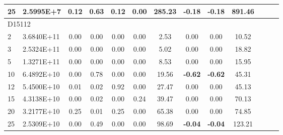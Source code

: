 {\begin{longtable}{@{}llccccccccccc@{}}
\multicolumn{1}{l|}{25} & \multicolumn{1}{l|}{2.5995E+7}  & \multicolumn{1}{c|}{0.12}    & \multicolumn{1}{c|}{0.63} & \multicolumn{1}{c|}{0.12}   & 0.00 & \multicolumn{1}{c|}{285.23}   & \textbf{-0.18}  & \textbf{-0.18}  & 891.46    \\ \hline
\multicolumn{10}{l}{D15112}                                                                                                                                                                                                               \\ \hline
\multicolumn{1}{l|}{2}  & \multicolumn{1}{l|}{3.6840E+11} & \multicolumn{1}{c|}{0.00}    & \multicolumn{1}{c|}{0.00} & \multicolumn{1}{c|}{0.00}   & 0.00 & \multicolumn{1}{c|}{2.53}     & 0.00            & 0.00            & 10.52     \\
\multicolumn{1}{l|}{3}  & \multicolumn{1}{l|}{2.5324E+11} & \multicolumn{1}{c|}{0.00}    & \multicolumn{1}{c|}{0.00} & \multicolumn{1}{c|}{0.00}   & 0.00 & \multicolumn{1}{c|}{5.02}     & 0.00            & 0.00            & 18.82     \\
\multicolumn{1}{l|}{5}  & \multicolumn{1}{l|}{1.3271E+11} & \multicolumn{1}{c|}{0.00}    & \multicolumn{1}{c|}{0.00} & \multicolumn{1}{c|}{0.00}   & 0.00 & \multicolumn{1}{c|}{8.53}     & 0.00            & 0.00            & 15.95     \\
\multicolumn{1}{l|}{10} & \multicolumn{1}{l|}{6.4892E+10} & \multicolumn{1}{c|}{0.00}    & \multicolumn{1}{c|}{0.78} & \multicolumn{1}{c|}{0.00}   & 0.00 & \multicolumn{1}{c|}{19.56}    & \textbf{-0.62}  & \textbf{-0.62}  & 45.31     \\
\multicolumn{1}{l|}{12} & \multicolumn{1}{l|}{5.4500E+10} & \multicolumn{1}{c|}{0.01}    & \multicolumn{1}{c|}{0.02} & \multicolumn{1}{c|}{0.92}   & 0.00 & \multicolumn{1}{c|}{27.47}    & 0.00            & 0.00            & 45.13     \\
\multicolumn{1}{l|}{15} & \multicolumn{1}{l|}{4.3138E+10} & \multicolumn{1}{c|}{0.00}    & \multicolumn{1}{c|}{0.02} & \multicolumn{1}{c|}{0.00}   & 0.24 & \multicolumn{1}{c|}{39.47}    & 0.00            & 0.00            & 70.13     \\
\multicolumn{1}{l|}{20} & \multicolumn{1}{l|}{3.2177E+10} & \multicolumn{1}{c|}{0.25}    & \multicolumn{1}{c|}{0.01} & \multicolumn{1}{c|}{0.25}   & 0.00 & \multicolumn{1}{c|}{65.38}    & 0.00            & 0.00            & 74.85     \\
\multicolumn{1}{l|}{25} & \multicolumn{1}{l|}{2.5309E+10} & \multicolumn{1}{c|}{0.00}    & \multicolumn{1}{c|}{0.49} & \multicolumn{1}{c|}{0.00}   & 0.00 & \multicolumn{1}{c|}{98.69}    & \textbf{-0.04}  & \textbf{-0.04}  & 123.21    \\ \hline

\end{longtable}}

